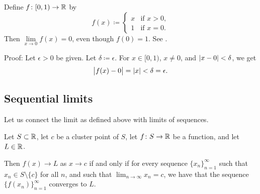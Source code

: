 \begin{example}
Define $f \colon [0,1) \to {\mathbb{R}}$ by
\begin{equation*}
f(x) \coloneqq 
\begin{cases}
x & \text{if } x > 0 , \\
1 & \text{if } x = 0 .
\end{cases}
\end{equation*}
Then
$\lim\limits_{x\to 0} f(x) = 0$,
even though $f(0) = 1$.  See .
\begin{myfigureht}
\caption{Function with a different limit and value at $0$.\label{fig:limvaldiff}}
\end{myfigureht}

Proof:  Let $\epsilon > 0$ be given.  Let $\delta \coloneqq \epsilon$.
For $x \in [0,1)$, $x \neq 0$, and $\lvert {x-0} \rvert < \delta$, we get
\begin{equation*}
\bigl\lvert {f(x) - 0} \bigr\rvert = \lvert {x} \rvert < \delta = \epsilon .
\end{equation*}
\end{example}

\subsection{Sequential limits} \label{subseq:sequentiallimits}

Let us connect the limit as defined above with limits of sequences.

\begin{lemma}\label{seqflimit:lemma}
Let $S \subset {\mathbb{R}}$, let $c$ be a cluster point of $S$, let $f \colon S \to
{\mathbb{R}}$ be a function, and let $L \in {\mathbb{R}}$.

Then
$f(x) \to L$ as $x \to c$ if and only if for every sequence
$\{ x_n \}_{n=1}^\infty$
such that $x_n \in S \setminus \{c\}$ for all $n$,
and such that $\lim_{n\to\infty} x_n = c$,
we have that the sequence $\bigl\{ f(x_n) \bigr\}_{n=1}^\infty$ converges to $L$.
\end{lemma}

